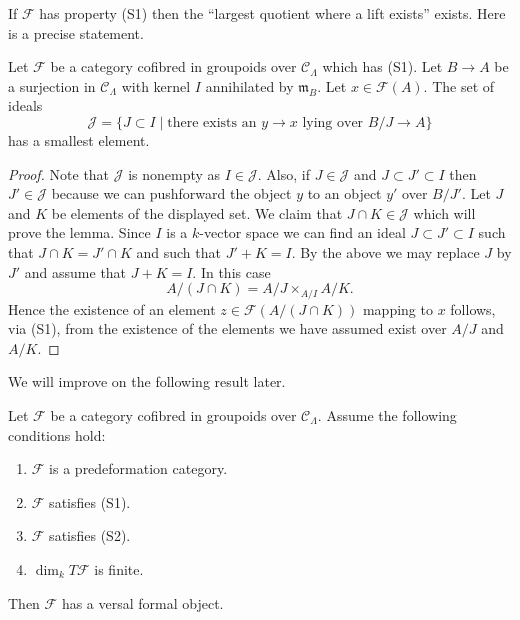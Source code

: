\noindent
If $\mathcal{F}$ has property (S1) then the ``largest quotient where
a lift exists'' exists. Here is a precise statement.

\begin{lemma}
\label{lemma-largest-closed-where-lift}
Let $\mathcal{F}$ be a category cofibred in groupoids over
$\mathcal{C}_\Lambda$ which has (S1). Let $B \to A$ be a surjection
in $\mathcal{C}_\Lambda$ with kernel $I$ annihilated by $\mathfrak m_B$.
Let $x \in \mathcal{F}(A)$. The set of ideals
$$
\mathcal{J} = \{ J \subset I \mid
\text{there exists an }y \to x\text{ lying over }B/J \to A\}
$$
has a smallest element.
\end{lemma}

\begin{proof}
Note that $\mathcal{J}$ is nonempty as $I \in \mathcal{J}$.
Also, if $J \in \mathcal{J}$ and $J \subset J' \subset I$ then
$J' \in \mathcal{J}$ because we can pushforward the object $y$ to an
object $y'$ over $B/J'$. Let $J$ and $K$ be elements of the displayed set.
We claim that $J \cap K \in \mathcal{J}$ which will prove the lemma.
Since $I$ is a $k$-vector space we can find an ideal $J \subset J' \subset I$
such that $J \cap K = J' \cap K$ and such that $J' + K = I$. By the above
we may replace $J$ by $J'$ and assume that $J + K = I$. In this case
$$
A/(J \cap K) = A/J \times_{A/I} A/K.
$$
Hence the existence of an element $z \in \mathcal{F}(A/(J \cap K))$
mapping to $x$ follows, via (S1), from the existence of the elements we have
assumed exist over $A/J$ and $A/K$.
\end{proof}

\noindent
We will improve on the following result later.

\begin{lemma}
\label{lemma-versal-object-existence}
Let $\mathcal{F}$ be a category cofibred in groupoids over
$\mathcal{C}_\Lambda$. Assume the following conditions hold:
\begin{enumerate}
\item $\mathcal{F}$ is a predeformation category.
\item $\mathcal{F}$ satisfies (S1).
\item $\mathcal{F}$ satisfies (S2).
\item $\dim_k T\mathcal{F}$ is finite.
\end{enumerate}
Then $\mathcal{F}$ has a versal formal object.
\end{lemma}

